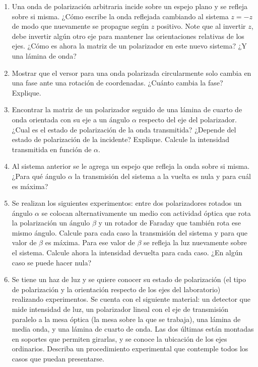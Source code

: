 \documentclass[11pt,spanish,a4paper]{article}
\begin{document}
\begin{enumerate}
\item Una onda de polarización arbitraria incide sobre un espejo plano y se refleja sobre si misma.
¿Cómo escribe la onda reflejada cambiando al sistema \(z= -z\) de modo que nuevamente se propague según \(z\) positivo.
Note que al invertir \(z\), debe invertir algún otro eje para mantener las orientaciones relativas de los ejes.
¿Cómo es ahora la matriz de un polarizador en este nuevo sistema?
¿Y una lámina de onda?


\item Mostrar que el versor para una onda polarizada circularmente solo cambia en una fase ante una rotación de coordenadas.
¿Cuánto cambia la fase?
Explique.


\item Encontrar la matriz de un polarizador seguido de una lámina de cuarto de onda orientada con su eje a un ángulo \( \alpha \) respecto del eje del polarizador.
¿Cual es el estado de polarización de la onda transmitida?
¿Depende del estado de polarización de la incidente?
Explique.
Calcule la intensidad transmitida en función de \( \alpha \).


\item Al sistema anterior se le agrega un espejo que refleja la onda sobre si misma.
¿Para qué ángulo \( \alpha \) la transmisión del sistema a la vuelta es nula y para cuál es máxima?


\item Se realizan los siguientes experimentos: entre dos polarizadores rotados un ángulo \( \alpha \) se colocan alternativamente un medio con actividad óptica que rota la polarización un ángulo \( \beta \) y un rotador de Faraday que también rota ese mismo ángulo.
Calcule para cada caso la transmisión del sistema y para que valor de \( \beta \) es máxima.
Para ese valor de \( \beta \) se refleja la luz nuevamente sobre el sistema.
Calcule ahora la intensidad devuelta para cada caso.
¿En algún caso se puede hacer nula?


\item Se tiene un haz de luz y se quiere conocer su estado de polarización (el tipo de polarización y la orientación respecto de los ejes del laboratorio) realizando experimentos.
Se cuenta con el siguiente material: un detector que mide intensidad de luz, un polarizador lineal con el eje de transmisión paralelo a la mesa óptica (la mesa sobre la que se trabaja), una lámina de media onda, y una lámina de cuarto de onda.
Las dos últimas están montadas en soportes que permiten girarlas, y se conoce la ubicación de los ejes ordinarios.
Describa un procedimiento experimental que contemple todos los casos que puedan presentarse.



\end{enumerate}
\end{document}
